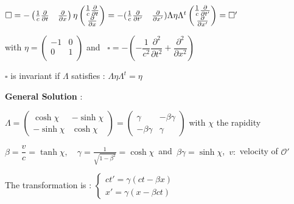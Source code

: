 \begin{squishlist}
\item $\square 
=-\left( \frac{1}{c} \frac{\partial}{\partial t} \quad \frac{\partial}{\partial x}\right) \eta
    \begin{pmatrix}
        \frac{1}{c}\frac{\partial}{\partial t}\\
	    \frac{\partial}{\partial x} 
	\end{pmatrix}
= -( \frac{1}{c} \frac{\partial }{\partial t'} \quad \frac{\partial }{\partial x'} )
 \Lambda \eta \Lambda^t \begin{pmatrix}
     \frac{1}{c}\frac{\partial }{\partial t'} \\
     \frac{\partial }{\partial x'}
 \end{pmatrix}
 =\square'$
 \item[] 
     with $\eta = 
    \begin{pmatrix}
	     -1 & 0 \\
		  0 & 1 \\
	\end{pmatrix}$ and \ $ \square=-\left( -\dfrac{1}{c^2}\dfrac{\partial^2}{\partial t^2} + \dfrac{\partial^2}{\partial x^2}\right)$ \\


\item $\square$ is invariant if $\Lambda$ satisfies : $\Lambda \eta \Lambda^t = \eta$ \\ 

\item[] \textbf{General Solution} : 
\item $ \Lambda = 
\begin{pmatrix}
\cosh \chi & -\sinh \chi \\
-\sinh \chi & \cosh \chi
\end{pmatrix}
= 
\begin{pmatrix}
    \gamma & -\beta\gamma \\
    -\beta\gamma & \gamma
\end{pmatrix}$ with $\chi$ the rapidity%

\item $\beta = \dfrac{v}{c} = \tanh \chi, \quad \gamma = \frac{1}{\sqrt{1-\beta^2}} = \cosh\chi \,$ and $\, \beta\gamma = \sinh\chi$, $\, v :$ velocity of $\mathcal{O}'$\\

\item  {The transformation is } : 
$\begin{cases}
ct' = \gamma (ct - \beta x) \\
x' = \gamma (x - \beta c t)
\end{cases}$


\end{squishlist}
